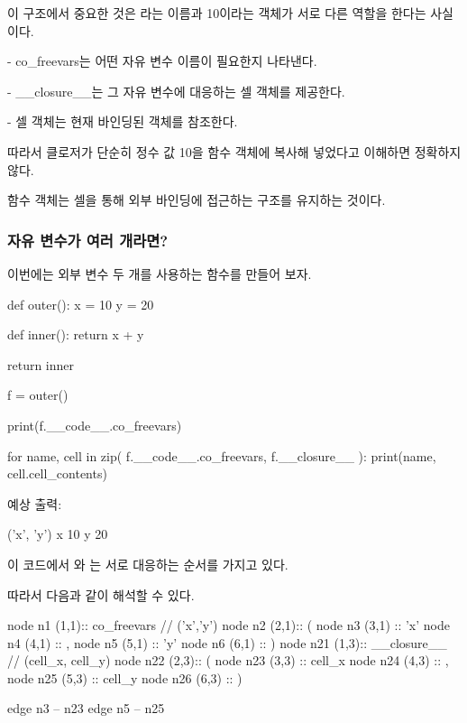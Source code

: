이 구조에서 중요한 것은 라는 이름과 10이라는 객체가 서로 다른 역할을 한다는 사실이다.

\begin{dhksmry}
    - co_freevars는 어떤 자유 변수 이름이 필요한지 나타낸다.

    - __closure__는 그 자유 변수에 대응하는 셀 객체를 제공한다.

    - 셀 객체는 현재 바인딩된 객체를 참조한다.
\end{dhksmry}

따라서 클로저가 단순히 정수 값 10을 함수 객체에 복사해 넣었다고 이해하면 정확하지 않다.

함수 객체는 셀을 통해 외부 바인딩에 접근하는 구조를 유지하는 것이다.

\subsubsection{자유 변수가 여러 개라면?}

이번에는 외부 변수 두 개를 사용하는 함수를 만들어 보자.

\begin{dhkcode}
def outer():
    x = 10
    y = 20

    def inner():
        return x + y

    return inner


f = outer()

print(f.__code__.co_freevars)

for name, cell in zip(
    f.__code__.co_freevars,
    f.__closure__
):
    print(name, cell.cell_contents)
\end{dhkcode}

예상 출력:

\begin{dhkzsh}
('x', 'y')
x 10
y 20
\end{dhkzsh}

이 코드에서 와 는 서로 대응하는 순서를 가지고 있다.

따라서 다음과 같이 해석할 수 있다.

\begin{dhkdiagram}[in=6]
node n1 (1,1):: co_freevars // ('x','y')
node n2 (2,1):: (
node n3 (3,1) :: 'x'
node n4 (4,1) :: ,
node n5 (5,1) :: 'y'
node n6 (6,1) :: )
node n21 (1,3):: __closure__ // (cell_x, cell_y)
node n22 (2,3):: (
node n23 (3,3) :: cell_x
node n24 (4,3) :: ,
node n25 (5,3) :: cell_y
node n26 (6,3) :: )

edge n3 -- n23
edge n5 -- n25
\end{dhkdiagram}

